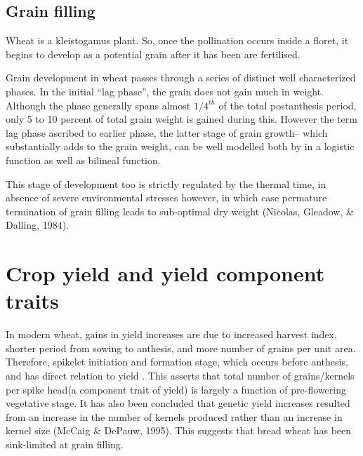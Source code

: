 \documentclass[12pt,oneside]{dukestatscithesis} %
\theoremstyle{definition}
\theoremstyle{definition}
\theoremstyle{definition}
\theoremstyle{remark}
\begin{document}
\subsection{Grain filling}\label{grain-filling}

Wheat is a kleistogamus plant. So, once the pollination occurs inside a
floret, it begins to develop as a potential grain after it has been are
fertilised.

Grain development in wheat passes through a series of distinct well
characterized phases. In the initial ``lag phase'', the grain does not
gain much in weight. Although the phase generally spans almost
\(1/4^{th}\) of the total postanthesis period, only 5 to 10 percent of
total grain weight is gained during this. However the term lag phase
ascribed to earlier phase, the latter stage of grain growth-- which
substantially adds to the grain weight, can be well modelled both by in
a logistic function as well as bilineal function.

This stage of development too is strictly regulated by the thermal time,
in absence of severe environmental stresses however, in which case
permature termination of grain filling leads to sub-optimal dry weight
(Nicolas, Gleadow, \& Dalling, 1984).

\section{Crop yield and yield component
traits}\label{crop-yield-and-yield-component-traits}

In modern wheat, gains in yield increases are due to increased harvest
index, shorter period from sowing to anthesis, and more number of grains
per unit area. Therefore, spikelet initiation and formation stage, which
occurs before anthesis, and has direct relation to yield . This asserts
that total number of grains/kernels per spike head(a component trait of
yield) is largely a function of pre-flowering vegetative stage. It has
also been concluded that genetic yield increases resulted from an
increase in the number of kernels produced rather than an increase in
kernel size (McCaig \& DePauw, 1995). This suggests that bread wheat has
been sink-limited at grain filling.
\end{document}
